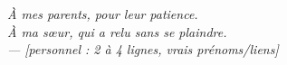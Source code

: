 \thispagestyle{empty}\null\vfill
\begin{flushright}\itshape\large
À mes parents, pour leur patience.\\
À ma sœur, qui a relu sans se plaindre.\\[1em]
\normalfont\small\color{mute}— [personnel : 2 à 4 lignes, vrais prénoms/liens]
\end{flushright}
\vfill\vfill\clearpage
